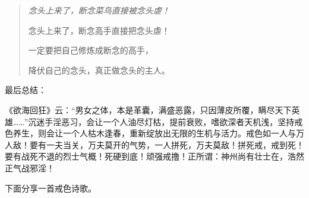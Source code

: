 \begin{quotation}\it
    念头上来了，断念菜鸟直接被念头虐！

    念头上来了，断念高手直接把念头虐！

    一定要把自己修炼成断念的高手，

    降伏自己的念头，真正做念头的主人。
\end{quotation}

最后总结：

《欲海回狂》云：“男女之体，本是革囊，满盛恶露，只因薄皮所覆，瞒尽天下英雄……”沉迷手淫恶习，会让一个人油尽灯枯，提前衰败，嗜欲深者天机浅，坚持戒色养生，则会让一个人枯木逢春，重新绽放出无限的生机与活力。戒色如一人与万人敌！要有一夫当关，万夫莫开的气势，一人拼死，万夫莫敌！拼死戒，戒到死！要有战死不退的烈士气概！死硬到底！顽强戒撸！正所谓：神州尚有壮士在，浩然正气战邪淫！

下面分享一首戒色诗歌。

